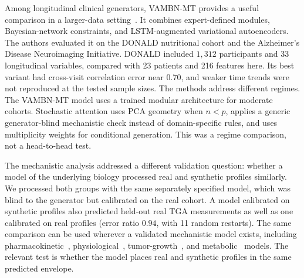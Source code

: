Among longitudinal clinical generators, VAMBN-MT provides a useful comparison in a
larger-data setting~\citep{Kuhnel2024}. It combines
expert-defined modules, Bayesian-network constraints, and LSTM-augmented variational
autoencoders. The authors evaluated it on the DONALD nutritional cohort and the Alzheimer's
Disease Neuroimaging Initiative. DONALD included $1{,}312$ participants and 33 longitudinal
variables, compared with 23 patients and 216 features here. Its best variant had cross-visit
correlation error near 0.70, and weaker time trends were not reproduced at the tested sample
sizes. The methods address different regimes. The VAMBN-MT model uses a trained modular architecture
for moderate cohorts. Stochastic attention uses PCA geometry when $n<p$, applies a generic
generator-blind mechanistic check instead of domain-specific rules, and uses multiplicity
weights for conditional generation. This was a regime comparison, not a head-to-head test.

The mechanistic analysis addressed a different validation question: whether a model of the
underlying biology processed real and synthetic profiles similarly. We processed both groups
with the same separately specified model, which was blind to the generator but
calibrated on the real cohort. A model calibrated on synthetic profiles also
predicted held-out real TGA measurements as well as one calibrated on real profiles (error
ratio $0.94$, with 11 random restarts). The same comparison can be used wherever a validated
mechanistic model exists, including pharmacokinetic~\citep{MouldUpton2013},
physiological~\citep{Chase2011}, tumor-growth~\citep{Ribba2012}, and
metabolic~\citep{Yizhak2015,Shan2018} models. The relevant test is whether the model places
real and synthetic profiles in the same predicted envelope.

